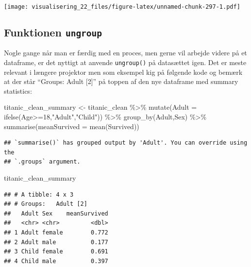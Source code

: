 \documentclass[
]{book}
\newenvironment{Shaded}{\begin{snugshade}}{\end{snugshade}}
\newcommand{\AttributeTok}[1]{\textcolor[rgb]{0.77,0.63,0.00}{#1}}
\newcommand{\DecValTok}[1]{\textcolor[rgb]{0.00,0.00,0.81}{#1}}
\newcommand{\FunctionTok}[1]{\textcolor[rgb]{0.00,0.00,0.00}{#1}}
\newcommand{\NormalTok}[1]{#1}
\newcommand{\OtherTok}[1]{\textcolor[rgb]{0.56,0.35,0.01}{#1}}
\newcommand{\SpecialCharTok}[1]{\textcolor[rgb]{0.00,0.00,0.00}{#1}}
\newcommand{\StringTok}[1]{\textcolor[rgb]{0.31,0.60,0.02}{#1}}
\begin{document}
\texttt{[image: visualisering\_22\_files/figure-latex/unnamed-chunk-297-1.pdf]}

\hypertarget{funktionen-ungroup}{%
\subsection{\texorpdfstring{Funktionen \texttt{ungroup}}{Funktionen ungroup}}\label{funktionen-ungroup}}

Nogle gange når man er færdig med en proces, men gerne vil arbejde videre på et dataframe, er det nyttigt at anvende \texttt{ungroup()} på datasættet igen. Det er meste relevant i længere projektor men som eksempel kig på følgende kode og bemærk at der står ``Groups: Adult {[}2{]}'' på toppen af den nye dataframe med summary statistics:

\begin{Shaded}
\begin{Highlighting}[]
\NormalTok{titanic\_clean\_summary }\OtherTok{\textless{}{-}}\NormalTok{ titanic\_clean }\SpecialCharTok{\%\textgreater{}\%}  
  \FunctionTok{mutate}\NormalTok{(}\AttributeTok{Adult =} \FunctionTok{ifelse}\NormalTok{(Age}\SpecialCharTok{\textgreater{}=}\DecValTok{18}\NormalTok{,}\StringTok{"Adult"}\NormalTok{,}\StringTok{"Child"}\NormalTok{)) }\SpecialCharTok{\%\textgreater{}\%}
  \FunctionTok{group\_by}\NormalTok{(Adult,Sex) }\SpecialCharTok{\%\textgreater{}\%} 
  \FunctionTok{summarise}\NormalTok{(}\AttributeTok{meanSurvived =} \FunctionTok{mean}\NormalTok{(Survived))}
\end{Highlighting}
\end{Shaded}

\begin{verbatim}
## `summarise()` has grouped output by 'Adult'. You can override using the
## `.groups` argument.
\end{verbatim}

\begin{Shaded}
\begin{Highlighting}[]
\NormalTok{titanic\_clean\_summary}
\end{Highlighting}
\end{Shaded}

\begin{verbatim}
## # A tibble: 4 x 3
## # Groups:   Adult [2]
##   Adult Sex    meanSurvived
##   <chr> <chr>         <dbl>
## 1 Adult female        0.772
## 2 Adult male          0.177
## 3 Child female        0.691
## 4 Child male          0.397
\end{verbatim}
\end{document}
